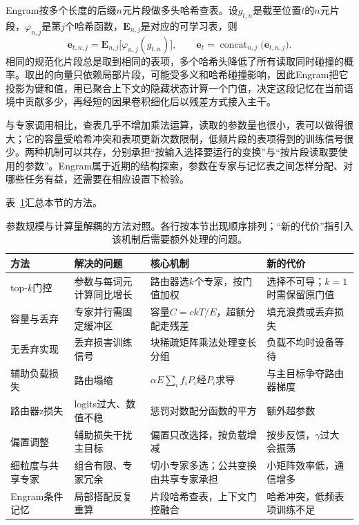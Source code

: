 Engram按多个长度的后缀$n$元片段做多头哈希查表。设$g_{t,n}$是截至位置$t$的$n$元片段，$\varphi_{n,j}$是第$j$个哈希函数，$\bm E_{n,j}$是对应的可学习表，则
\begin{equation}
 \bm e_{t,n,j}=\bm E_{n,j}\bigl[\varphi_{n,j}(g_{t,n})\bigr],\qquad
 \bm e_t=\operatorname{concat}_{n,j}\bigl(\bm e_{t,n,j}\bigr).
 \label{eq:nlp-llm-engram}
\end{equation}
相同的规范化片段总是取到相同的表项，多个哈希头降低了所有读取同时碰撞的概率。取出的向量只依赖局部片段，可能受多义和哈希碰撞影响，因此Engram把它投影为键和值，用已聚合上下文的隐藏状态计算一个门值，决定这段记忆在当前语境中贡献多少，再经短的因果卷积细化后以残差方式接入主干。

与专家调用相比，查表几乎不增加乘法运算，读取的参数量也很小，表可以做得很大；它的容量受哈希冲突和表项更新次数限制，低频片段的表项得到的训练信号很少。两种机制可以共存，分别承担“按输入选择要运行的变换”与“按片段读取要使用的参数”。Engram属于近期的结构探索，参数在专家与记忆表之间怎样分配、对哪些任务有益，还需要在相应设置下检验。

表~\ref{tab:nlp-llm-moe-methods}汇总本节的方法。

\begin{table}[htbp]
 \begin{tabularx}{\linewidth}{@{}p{28mm}p{34mm}p{46mm}X@{}}
  \toprule
  方法 & 解决的问题 & 核心机制 & 新的代价\\
  \midrule
  top-$k$门控 & 参数与每词元计算同比增长 & 路由器选$k$个专家，按门值加权 & 选择不可导；$k=1$时需保留原门值\\
  容量与丢弃 & 专家并行需固定缓冲区 & 容量$C=ckT/E$，超额分配走残差 & 填充浪费或丢弃损失\\
  无丢弃实现 & 丢弃损害训练信号 & 块稀疏矩阵乘法处理变长分组 & 负载不均时设备等待\\
  辅助负载损失 & 路由塌缩 & $\alpha E\sum_if_iP_i$经$P_i$求导 & 与主目标争夺路由器梯度\\
  路由器z损失 & logits过大、数值不稳 & 惩罚对数配分函数的平方 & 额外超参数\\
  偏置调整 & 辅助损失干扰主目标 & 偏置只改选择，按负载增减 & 按步反馈，$\gamma$过大会振荡\\
  细粒度与共享专家 & 组合有限、专家冗余 & 切小专家多选；公共变换由共享专家承担 & 小矩阵效率低，通信增多\\
  Engram条件记忆 & 局部搭配反复重算 & 片段哈希查表，上下文门控融合 & 哈希冲突，低频表项训练不足\\
  \bottomrule
 \end{tabularx}
 \caption{参数规模与计算量解耦的方法对照。各行按本节出现顺序排列；“新的代价”指引入该机制后需要额外处理的问题。}
 \label{tab:nlp-llm-moe-methods}
\end{table}
